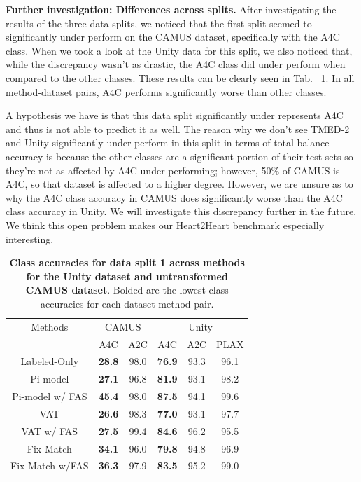 \textbf{Further investigation: Differences across splits.}
After investigating the results of the three data splits, we noticed that the first split seemed to significantly under perform on the CAMUS dataset, specifically with the A4C class. When we took a look at the Unity data for this split, we also noticed that, while the discrepancy wasn't as drastic, the A4C class did under perform when compared to the other classes. These results can be clearly seen in Tab. ~\ref{tab:a4c_class_accuracies}. In all method-dataset pairs, A4C performs significantly worse than other classes. 

A hypothesis we have is that this data split significantly under represents A4C and thus is not able to predict it as well. The reason why we don't see TMED-2 and Unity significantly under perform in this split in terms of total balance accuracy is because the other classes are a significant portion of their test sets so they're not as affected by A4C under performing; however, 50\% of CAMUS is A4C, so that dataset is affected to a higher degree. However, we are unsure as to why the A4C class accuracy in CAMUS does significantly worse than the A4C class accuracy in Unity. We will investigate this discrepancy further in the future. We think this open problem makes our Heart2Heart benchmark especially interesting.
\begin{table}[!h]
\centering
\begin{tabular}{c | c  c | c  c  c  }
\multicolumn{1}{c}{Methods} & \multicolumn{2}{c}{CAMUS} & \multicolumn{3}{c}{Unity}\\
 & A4C & A2C & A4C & A2C & PLAX 
 \\ \hline
Labeled-Only & \textbf{28.8} & 98.0 & \textbf{76.9} & 93.3 & 96.1\\
Pi-model & \textbf{27.1} &  96.8 & \textbf{81.9} & 93.1 & 98.2 \\
Pi-model w/ FAS & \textbf{45.4} & 98.0 & \textbf{87.5} & 94.1 & 99.6 \\
VAT & \textbf{26.6}& 98.3 & \textbf{77.0} & 93.1 & 97.7 \\
VAT w/ FAS  & \textbf{27.5}& 99.4& \textbf{84.6} & 96.2 & 95.5\\
Fix-Match & \textbf{34.1} & 96.0 & \textbf{79.8} & 94.8& 96.9\\
Fix-Match w/FAS & \textbf{36.3} & 97.9 & \textbf{83.5} & 95.2 & 99.0 \\

\end{tabular}
    \caption{
    \textbf{Class accuracies for data split 1 across methods for the Unity dataset and untransformed CAMUS dataset}. Bolded are the lowest class accuracies for each dataset-method pair.
    }%
    \label{tab:a4c_class_accuracies}
\end{table}